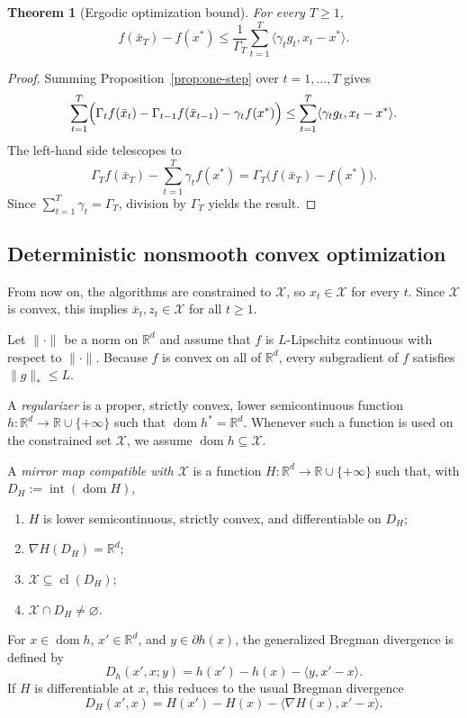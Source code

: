 \documentclass[11pt]{article}
\newtheorem{theorem}{Theorem}[section]
\theoremstyle{definition}
\theoremstyle{remark}
\newcommand{\R}{\mathbb{R}}
\newcommand{\X}{\mathcal{X}}
\newcommand{\inner}[2]{\langle #1, #2 \rangle}
\newcommand{\norm}[1]{\lVert #1 \rVert}
\newcommand{\normdual}[1]{\lVert #1 \rVert_*}
\DeclareMathOperator{\dom}{dom}
\begin{document}
\begin{theorem}[Ergodic optimization bound]
\label{thm:ergodic}
For every $T\ge 1$,
\[
    f(\bar{x}_T)-f(x^*)
    \le
    \frac{1}{\Gamma_T}\sum_{t=1}^T \inner{\gamma_t g_t}{x_t-x^*}.
\]
\end{theorem}

\begin{proof}
Summing Proposition~\ref{prop:one-step} over $t=1,\dots,T$ gives
\[
    \sum_{t=1}^T
    \Bigl(
        \Gamma_t f(\bar{x}_t)-\Gamma_{t-1}f(\bar{x}_{t-1})-\gamma_t f(x^*)
    \Bigr)
    \le
    \sum_{t=1}^T \inner{\gamma_t g_t}{x_t-x^*}.
\]
The left-hand side telescopes to
\[
    \Gamma_T f(\bar{x}_T) - \sum_{t=1}^T \gamma_t f(x^*)
    =
    \Gamma_T\bigl(f(\bar{x}_T)-f(x^*)\bigr).
\]
Since $\sum_{t=1}^T \gamma_t = \Gamma_T$, division by $\Gamma_T$ yields the result.
\end{proof}

\subsection{Deterministic nonsmooth convex optimization}
\label{sec:deterministic}

From now on, the algorithms are constrained to $\X$, so $x_t \in \X$ for every $t$. Since $\X$ is convex, this implies $\bar{x}_t, z_t \in \X$ for all $t\ge 1$.

Let $\norm{\cdot}$ be a norm on $\R^d$ and assume that $f$ is $L$-Lipschitz continuous with respect to $\norm{\cdot}$. Because $f$ is convex on all of $\R^d$, every subgradient of $f$ satisfies $\normdual{g} \le L$.

A \emph{regularizer} is a proper, strictly convex, lower semicontinuous function $h : \R^d \to \R \cup \{+\infty\}$ such that $\dom h^*=\R^d$. Whenever such a function is used on the constrained set $\X$, we assume $\dom h \subseteq \X$.

A \emph{mirror map compatible with $\X$} is a function $H : \R^d \to \R \cup \{+\infty\}$ such that, with $D_H := \operatorname{int}(\dom H)$,
\begin{enumerate}[label=(\roman*)]
    \item $H$ is lower semicontinuous, strictly convex, and differentiable on $D_H$;
    \item $\nabla H(D_H)=\R^d$;
    \item $\X \subseteq \operatorname{cl}(D_H)$;
    \item $\X \cap D_H \neq \varnothing$.
\end{enumerate}
For $x \in \dom h$, $x' \in \R^d$, and $y \in \partial h(x)$, the generalized Bregman divergence is defined by
\[
    D_h(x',x;y) = h(x')-h(x)-\inner{y}{x'-x}.
\]
If $H$ is differentiable at $x$, this reduces to the usual Bregman divergence
\[
    D_H(x',x) = H(x')-H(x)-\inner{\nabla H(x)}{x'-x}.
\]
\end{document}
